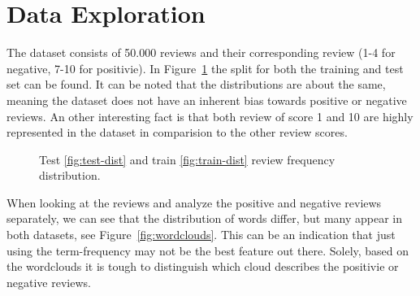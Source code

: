 \section{Data Exploration}

The dataset consists of 50.000 reviews and their corresponding review (1-4 for negative, 7-10 for positivie). 
In Figure~\ref{fig:data-dist} the split for both the training and test set can be found.
It can be noted that the distributions are about the same, meaning the dataset does not have an inherent bias towards positive or negative reviews.
An other interesting fact is that both review of score 1 and 10 are highly represented in the dataset in comparision to the other review scores.

\begin{figure}[ht!]
    \centering
    \hfill
  \caption{Test \ref{fig:test-dist} and train \ref{fig:train-dist} review frequency distribution.}
  \label{fig:data-dist} 
\end{figure}

When looking at the reviews and analyze the positive and negative reviews separately, we can see that the distribution of words differ, but many appear in both datasets, see Figure~\ref{fig:wordclouds}.
This can be an indication that just using the term-frequency may not be the best feature out there.
Solely, based on the wordclouds it is tough to distinguish which cloud describes the positivie or negative reviews.

